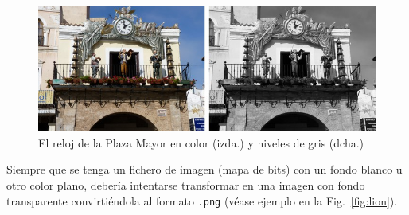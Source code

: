 \documentclass[11pt,a4paper]{article}
\begin{document}
\begin{figure}[hbt]
	\centering
		\includegraphics[width=0.6\linewidth]{2clockCR}
		\caption[Varias imágenes como una]{El reloj de la Plaza Mayor en color (izda.) y niveles de gris (dcha.)}
	\label{fig:2clock}
\end{figure}


Siempre que se tenga un fichero de imagen (mapa de bits) con un fondo blanco u otro color plano, debería intentarse transformar en una imagen con fondo transparente convirtiéndola al formato \texttt{.png} (véase ejemplo en la Fig.~\ref{fig:lion}).
\end{document}

